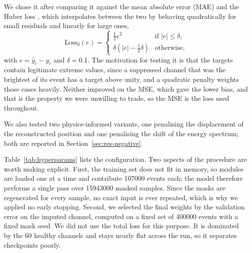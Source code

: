 \documentclass[10pt,conference]{IEEEtran}
\begin{document}
We chose it after comparing it against the mean absolute error (MAE) and the
Huber loss \cite{huber1964}, which interpolates between the two by behaving
quadratically for small residuals and linearly for large ones,
%
\begin{equation}
\mathrm{Loss}_{\delta}(e) =
\begin{cases}
\tfrac{1}{2} e^{2} & \text{if } \lvert e \rvert \le \delta, \\[2pt]
\delta \left( \lvert e \rvert - \tfrac{1}{2}\delta \right) & \text{otherwise,}
\end{cases}
\label{eq:huber}
\end{equation}
%
with $e = \hat{y}_{c} - y_{c}$ and $\delta = 0.1$. The motivation for testing it
is that the targets contain legitimate extreme values, since a suppressed
channel that was the brightest of its event has a target above unity, and a
quadratic penalty weights those cases heavily. Neither improved on the MSE,
which gave the lower bias, and that is the property we were unwilling to trade,
so the MSE is the loss used throughout.

We also tested two physics-informed variants, one penalising the displacement
of the reconstructed position and one penalising the shift of the energy
spectrum; both are reported in Section~\ref{sec:res-negative}.

Table~\ref{tab:hyperparams} lists the configuration. Two aspects of the
procedure are worth making explicit. First, the training set does not fit in
memory, so modules are loaded one at a time and contribute \num{107000} events
each; the model therefore performs a single pass over \num{15943000} masked
samples. Since the masks are regenerated for every sample, no exact input is
ever repeated, which is why we applied no early stopping. Second, we selected
the final weights by the validation error on the imputed channel, computed on
a fixed set of \num{400000} events with a fixed mask seed. We did not use the
total loss for this purpose. It is dominated by the 60 healthy channels and
stays nearly flat across the run, so it separates checkpoints poorly.
\end{document}
